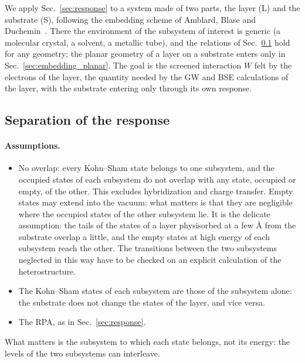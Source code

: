 \documentclass[10pt,a4paper]{paper}
\begin{document}
We apply Sec.~\ref{sec:response} to a system made of two parts, the layer (L) and the substrate (S), following the
embedding scheme of Amblard, Blase and Duchemin~\cite{amblard2024static}. There the environment of the subsystem of
interest is generic (a molecular crystal, a solvent, a metallic tube), and the relations of
Sec.~\ref{sec:embedding_general} hold for any geometry; the planar geometry of a layer on a substrate enters only in
Sec.~\ref{sec:embedding_planar}. The goal is the screened interaction $W$ felt by the electrons
of the layer, the quantity needed by the GW and BSE calculations of the layer, with the substrate entering only
through its own response.

\subsection{Separation of the response}
\label{sec:embedding_general}

\paragraph{Assumptions.}
\begin{itemize}
\item No overlap: every Kohn--Sham state belongs to one subsystem, and the occupied states of each subsystem do not
  overlap with any state, occupied or empty, of the other. This excludes hybridization and charge transfer. Empty
  states may extend into the vacuum: what matters is that they are negligible where the occupied states of the other
  subsystem lie. It is the delicate assumption: the tails of the states of a layer physisorbed at a few \AA{} from the
  substrate overlap a little, and the empty states at high energy of each subsystem reach the other. The transitions
  between the two subsystems neglected in this way have to be checked on an explicit calculation of the
  heterostructure.
\item The Kohn--Sham states of each subsystem are those of the subsystem alone: the substrate does not change the
  states of the layer, and vice versa.
\item The RPA, as in Sec.~\ref{sec:response}.
\end{itemize}
What matters is the subsystem to which each state belongs, not its energy: the levels of the two subsystems can
interleave.
\end{document}
